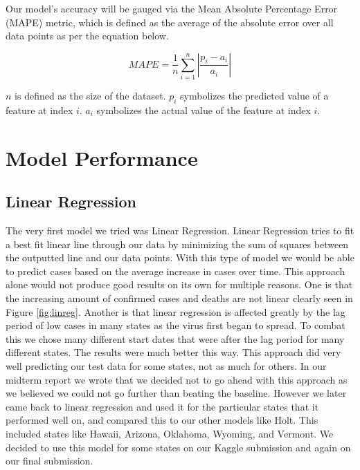 \documentclass[sigconf,nonacm]{acmart}
\begin{document}
Our model's accuracy will be gauged via the Mean Absolute Percentage Error
(MAPE) metric, which is defined as the average of the absolute error over all
data points as per the equation below. 

$$MAPE = \frac{1}{n} \sum_{i = 1}^{n} |\frac{p_i - a_i}{a_i} |$$

$n$ is defined as the size of the dataset. $p_i$ symbolizes the predicted value
of a feature at index $i$. $a_i$ symbolizes the actual value of the feature at
index $i$.


\section{Model Performance}
\subsection{Linear Regression}
The very first model we tried was Linear Regression. Linear Regression tries to fit a best fit linear line through our data by minimizing the sum of squares between the outputted line and our data points\cite{scikit-learn}. With this type of model we would be able to predict cases based on the average increase in cases over time. This approach alone would not produce good results on its own for multiple reasons. One is that the increasing amount of confirmed cases and deaths are not linear clearly seen in Figure \ref{fig:linreg}. Another is that linear regression is affected greatly by the lag period of low cases in many states as the virus first began to spread. To combat this we chose many different start dates that were after the lag period for many different states. The results were much better this way. This approach did very well predicting our test data for some states, not as much for others. In our midterm report we wrote that we decided not to go ahead with this approach as we believed we could not go further than beating the baseline. However we later came back to linear regression and used it for the particular states that it performed well on, and compared this to our other models like Holt. This included states like Hawaii, Arizona, Oklahoma, Wyoming, and Vermont. We decided to use this model for some states on our Kaggle submission and again on our final submission. 
\end{document}
